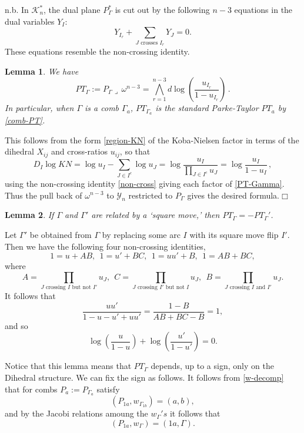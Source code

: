 \documentclass[11pt]{article}
\newcommand{\cK}{\mathcal{K}}
\newcommand{\cY}{\mathcal{Y}}
\newcommand{\1}{{\rm 1\hskip-0.25em I}}
\newcommand{\proof}{ \noindent {\bf Proof:} }
\newtheorem{lemma}{Lemma}[section]
\begin{document}
n.b. In $\cK_n^*$, the dual plane $P_\Gamma^*$ is cut out by the following $n-3$ equations in the dual variables $Y_I$:
$$
Y_{I_r} + \sum_{J\text{ crosses } I_r} Y_J = 0.
$$
These equations resemble the non-crossing identity. 

\begin{lemma} We have
\begin{equation}
PT_\Gamma:=P_\Gamma\lrcorner \, \omega^{n-3}=\bigwedge_{r=1}^{n-3} d\log \left(\frac{u_{I_r}}{1-u_{I_r}}\right)\, .\label{PT-Gamma}
\end{equation}
In particular, when $\Gamma$ is a comb $\Gamma_a$, $PT_{\Gamma_a}$ is the standard Parke-Taylor $PT_a$ by \eqref{comb-PT}.
\end{lemma}

\proof
This follows from the form \eqref{region-KN} of the Koba-Nielsen factor in terms of the dihedral  $X_{ij}$ and cross-ratios $u_{ij}$, so that
\begin{equation}
D_I \log  KN= \log u_I -\sum_{J\in I^c} \log u_J= \log \frac{u_I}{\prod_{J\in I^c} u_J}=\log \frac{u_I}{1-u_I}\, ,
\end{equation}
using the non-crossing identity \eqref{non-cross} giving each factor of \eqref{PT-Gamma}.
Thus  the pull back of $\omega^{n-3}$ to $\cY_n$ restricted to $P_\Gamma$ gives the desired formula.$\Box$

\begin{lemma}
If $\Gamma$ and $\Gamma'$ are related by a `square move,' then $PT_\Gamma = - PT_\Gamma'$. 
\end{lemma}

\proof
Let $\Gamma'$ be obtained from $\Gamma$ by replacing some arc $I$ with its square move flip $I'$. Then we have the following four non-crossing identities,
$$
1 = u + AB,~~1=u'+BC,~~1 = uu' + B,~~1 = AB+BC,
$$
where
$$
A = \prod_{J\text{ crossing } I \text{ but not } I'}u_J,~~C = \prod_{J\text{ crossing } I' \text{ but not } I}u_J, ~~B = \prod_{J\text{ crossing } I \text{ and } I'}u_J.
$$
It follows that
$$
\frac{uu'}{1-u-u'+uu'} = \frac{1-B}{AB+BC-B} = 1,
$$
and so
$$
\log\left(\frac{u}{1-u}\right)+\log\left(\frac{u'}{1-u'}\right) = 0.
$$

Notice that this lemma means that $PT_\Gamma$ depends, up to a sign, only on the Dihedral structure. We can fix the sign as follows. It follows from \eqref{w-decomp} that for combs $P_a:=P_{\Gamma_a}$ satisfy 
\begin{equation}
(P_{1a},w_{\Gamma_{1b}}) = (a,b),
\end{equation}
and by the Jacobi relations amoung the $w_\Gamma's$ it follows that
$$
(P_{1a},w_\Gamma) = (1a,\Gamma).
$$
\end{document}
